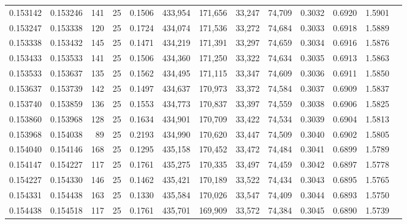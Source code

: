 \begin{tabular}{rrrrrrrrrrrrr}
0.153142 & 0.153246 &   141 &  25 &                                     0.1506 & 433,954 & 171,656 &  33,247 &  74,709 & 0.3032 & 0.6920 & 1.5901 \\
0.153247 & 0.153338 &   120 &  25 &                                     0.1724 & 434,074 & 171,536 &  33,272 &  74,684 & 0.3033 & 0.6918 & 1.5889 \\
0.153338 & 0.153432 &   145 &  25 &                                     0.1471 & 434,219 & 171,391 &  33,297 &  74,659 & 0.3034 & 0.6916 & 1.5876 \\
0.153433 & 0.153533 &   141 &  25 &                                     0.1506 & 434,360 & 171,250 &  33,322 &  74,634 & 0.3035 & 0.6913 & 1.5863 \\
0.153533 & 0.153637 &   135 &  25 &                                     0.1562 & 434,495 & 171,115 &  33,347 &  74,609 & 0.3036 & 0.6911 & 1.5850 \\
0.153637 & 0.153739 &   142 &  25 &                                     0.1497 & 434,637 & 170,973 &  33,372 &  74,584 & 0.3037 & 0.6909 & 1.5837 \\
0.153740 & 0.153859 &   136 &  25 &                                     0.1553 & 434,773 & 170,837 &  33,397 &  74,559 & 0.3038 & 0.6906 & 1.5825 \\
0.153860 & 0.153968 &   128 &  25 &                                     0.1634 & 434,901 & 170,709 &  33,422 &  74,534 & 0.3039 & 0.6904 & 1.5813 \\
0.153968 & 0.154038 &    89 &  25 &                                     0.2193 & 434,990 & 170,620 &  33,447 &  74,509 & 0.3040 & 0.6902 & 1.5805 \\
0.154040 & 0.154146 &   168 &  25 &                                     0.1295 & 435,158 & 170,452 &  33,472 &  74,484 & 0.3041 & 0.6899 & 1.5789 \\
0.154147 & 0.154227 &   117 &  25 &                                     0.1761 & 435,275 & 170,335 &  33,497 &  74,459 & 0.3042 & 0.6897 & 1.5778 \\
0.154227 & 0.154330 &   146 &  25 &                                     0.1462 & 435,421 & 170,189 &  33,522 &  74,434 & 0.3043 & 0.6895 & 1.5765 \\
0.154331 & 0.154438 &   163 &  25 &                                     0.1330 & 435,584 & 170,026 &  33,547 &  74,409 & 0.3044 & 0.6893 & 1.5750 \\
0.154438 & 0.154518 &   117 &  25 &                                     0.1761 & 435,701 & 169,909 &  33,572 &  74,384 & 0.3045 & 0.6890 & 1.5739 \\

\end{tabular}
